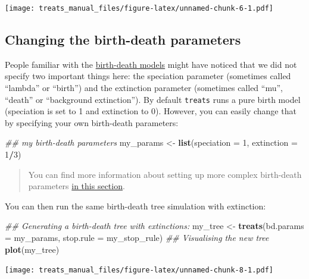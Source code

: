 \documentclass[
]{book}
\newenvironment{Shaded}{\begin{snugshade}}{\end{snugshade}}
\newcommand{\CommentTok}[1]{\textcolor[rgb]{0.56,0.35,0.01}{\textit{#1}}}
\newcommand{\DataTypeTok}[1]{\textcolor[rgb]{0.13,0.29,0.53}{#1}}
\newcommand{\DecValTok}[1]{\textcolor[rgb]{0.00,0.00,0.81}{#1}}
\newcommand{\KeywordTok}[1]{\textcolor[rgb]{0.13,0.29,0.53}{\textbf{#1}}}
\newcommand{\NormalTok}[1]{#1}
\newcommand{\OperatorTok}[1]{\textcolor[rgb]{0.81,0.36,0.00}{\textbf{#1}}}
\newcommand{\StringTok}[1]{\textcolor[rgb]{0.31,0.60,0.02}{#1}}
\begin{document}
\texttt{[image: treats\_manual\_files/figure-latex/unnamed-chunk-6-1.pdf]}

\hypertarget{changing-the-birth-death-parameters}{%
\subsection{Changing the birth-death parameters}\label{changing-the-birth-death-parameters}}

People familiar with the \href{https://lukejharmon.github.io/pcm/chapter10_birthdeath/}{birth-death models} might have noticed that we did not specify two important things here: the speciation parameter (sometimes called ``lambda'' or ``birth'') and the extinction parameter (sometimes called ``mu'', ``death'' or ``background extinction'').
By default \texttt{treats} runs a pure birth model (speciation is set to 1 and extinction to 0).
However, you can easily change that by specifying your own birth-death parameters:

\begin{Shaded}
\begin{Highlighting}[]
\CommentTok{\#\# my birth{-}death parameters}
\NormalTok{my\_params \textless{}{-}}\StringTok{ }\KeywordTok{list}\NormalTok{(}\DataTypeTok{speciation =} \DecValTok{1}\NormalTok{,}
                  \DataTypeTok{extinction =} \DecValTok{1}\OperatorTok{/}\DecValTok{3}\NormalTok{)}
\end{Highlighting}
\end{Shaded}

\begin{quote}
You can find more information about setting up more complex birth-death parameters \protect\hyperlink{makebdparams}{in this section}.
\end{quote}

You can then run the same birth-death tree simulation with extinction:

\begin{Shaded}
\begin{Highlighting}[]
\CommentTok{\#\# Generating a birth{-}death tree with extinctions:}
\NormalTok{my\_tree \textless{}{-}}\StringTok{ }\KeywordTok{treats}\NormalTok{(}\DataTypeTok{bd.params =}\NormalTok{ my\_params, }\DataTypeTok{stop.rule =}\NormalTok{ my\_stop\_rule)}
\CommentTok{\#\# Visualising the new tree}
\KeywordTok{plot}\NormalTok{(my\_tree)}
\end{Highlighting}
\end{Shaded}

\texttt{[image: treats\_manual\_files/figure-latex/unnamed-chunk-8-1.pdf]}
\end{document}
